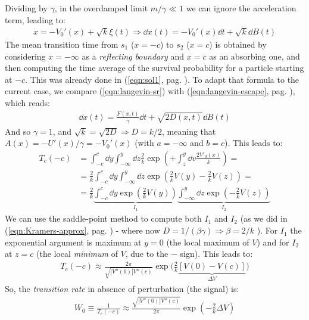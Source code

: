\documentclass[../template.tex]{subfiles}
\begin{document}
Dividing by $\gamma$, in the overdamped limit $m/\gamma \ll 1$ we can ignore the acceleration term, leading to:
\begin{align} \label{eqn:langevin-sr}
    \dot{x} = -V_0'(x) + \sqrt{k}\xi(t) \Rightarrow \dd{x(t)} = -V_0'(x) \dd{t} +  \sqrt{k} \dd{B(t)}
\end{align}
The mean transition time from $s_1$ ($x=-c$) to $s_2$ ($x=c$) is obtained by considering $x=-\infty$ as a \textit{reflecting boundary} and $x=c$ as an absorbing one, and then computing the time average of the survival probability for a particle starting at $-c$. This was already done in (\ref{eqn:sol1}, pag. \pageref{eqn:sol1}). To adapt that formula to the current case, we compare (\ref{eqn:langevin-sr}) with (\ref{eqn:langevin-escape}, pag. \pageref{eqn:langevin-escape}), which reads:
\begin{align*}
    \dd{x(t)} = \frac{F(x,t)}{\gamma} \dd{t} + \sqrt{2D(x,t)} \dd{B(t)}
\end{align*}
And so $\gamma = 1$, and $\sqrt{k} = \sqrt{2 D} \Rightarrow D = k/2$, meaning that $A(x) = -U'(x)/\gamma = -V_0'(x)$ (with $a=-\infty$ and $b=c$). This leads to:
\begin{align*}
    T_c(-c) &= \int_{-c}^c \dd{y} \int_{-\infty}^y \dd{z}\frac{2}{k} \exp\left(+\int_z^y \dd{v} \frac{2V'_0(x)}{k} \right) =\\
    &= \frac{2}{k} \int_{-c}^c \dd{y} \int_{-\infty}^y \dd{z} \exp\left(\frac{2}{k} V(y) - \frac{2}{k} V(z)  \right) =\\
    &= \frac{2}{k} \underbrace{\int_{-c}^c \dd{y} \exp\left(\frac{2}{k} V(y) \right)}_{I_1}   \underbrace{\int_{-\infty}^{y} \dd{z\exp\left(-\frac{2}{k} V(z) \right)}}_{I_2} 
\end{align*}
We can use the saddle-point method to compute both $I_1$ and $I_2$ (as we did in (\ref{eqn:Kramers-approx}, pag. \pageref{eqn:Karamers-approx}) - where now $D = 1/(\beta \gamma) \Rightarrow \beta = 2/k$ ). For $I_1$ the exponential argument is maximum at $y=0$ (the local maximum of $V$) and for $I_2$ at $z=c$ (the local \textit{minimum} of $V$, due to the $-$ sign). This leads to:
\begin{align*}
    T_c(-c) \approx \frac{2 \pi}{\sqrt{|V''(0)| V''(c)}} \exp\Big(\frac{2}{k} \underbrace{[V(0) - V(c)]}_{\Delta V} \Big)
\end{align*}
So, the \textit{transition rate} in absence of perturbation (the signal) is:
\begin{align} \label{eqn:tran-rate-unperturbed}
    W_0 \equiv \frac{1}{T_c(-c)} \approx \frac{\sqrt{|V''(0)| V''(c)}}{2 \pi} \exp\left(-\frac{2}{k} \Delta V \right)  
\end{align} 
\end{document}
